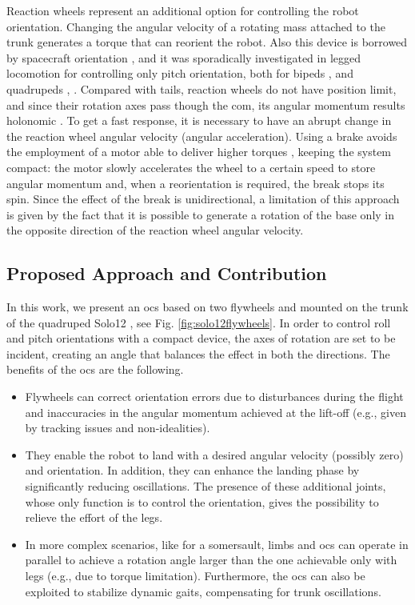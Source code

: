 \documentclass[journal,letterpaper]{IEEEtran}
\begin{document}
Reaction wheels represent an additional option for controlling the robot orientation.
Changing the angular velocity of a rotating mass attached to the trunk generates a torque that can reorient the robot. Also this device is borrowed by spacecraft orientation \cite{oland2009reaction}, and it was sporadically investigated in legged locomotion for controlling only pitch orientation, both for bipeds \cite{Brown2016}, \cite{xiong2020sequential} and quadrupeds \cite{kolvenbach2019towards}, \cite{vasilopoulos2016quadruped}.
Compared with tails, reaction wheels do not have position limit, and since their rotation axes pass though the \acrshort{com}, its angular momentum results holonomic \cite{machairas2015quadruped}.
To get a fast response, it is necessary to have an abrupt change in the reaction wheel angular velocity (angular acceleration).
Using a brake avoids the employment of a motor able to deliver higher torques \cite{gajamohan2012cubli}, keeping the system compact: the motor slowly accelerates the wheel to a certain speed to store angular momentum and, when a reorientation is required, the break stops its spin.
Since the effect of the break is unidirectional,
a limitation of this approach is given by the fact that it is possible to generate a rotation of the base only in the opposite direction of the reaction wheel angular velocity.

\subsection{Proposed Approach and Contribution}
In this work, we present an \acrfull{ocs} based on two flywheels and mounted on the trunk of the quadruped Solo12 \cite{grimminger2020open}, see Fig. \ref{fig:solo12flywheels}. In order to control roll and pitch orientations with a compact device, the axes of rotation are set to be incident, creating an angle that balances the effect in both the directions. The benefits of the \acrshort{ocs} are the following.
\begin{itemize}
	\item Flywheels can correct orientation errors due to disturbances during the flight and inaccuracies in the angular momentum achieved at the lift-off (e.g., given by tracking issues and non-idealities). 
	\item They enable the robot to land with a desired angular velocity (possibly zero) and orientation.
	In addition, they can enhance the landing phase by significantly reducing oscillations.  
	The presence of these additional joints, whose only function is to control the orientation, gives the possibility to relieve the effort of the legs.
	\item In more complex scenarios, like for a somersault, limbs and \acrshort{ocs} can operate in parallel to achieve a rotation angle larger than the one achievable only with legs (e.g., due to torque limitation). Furthermore, the \acrshort{ocs} can also be exploited to stabilize dynamic gaits, compensating for trunk oscillations.
\end{itemize}
\end{document}

